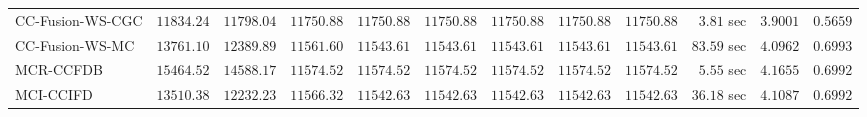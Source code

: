 \begin{table}[H]
\begin{tabular}{lrrrrrrrrrrr}
    CC-Fusion-WS-CGC & $     11834.24$ & $     11798.04$ & $     11750.88$ & $     11750.88$ & $     11750.88$ & $     11750.88$ & $     11750.88$ & $     11750.88$ & $         3.81$ sec    & $       3.9001$  & $       0.5659$ \\ 
     CC-Fusion-WS-MC & $     13761.10$ & $     12389.89$ & $     11561.60$ & $     11543.61$ & $     11543.61$ & $     11543.61$ & $     11543.61$ & $     11543.61$ & $        83.59$ sec    & $       4.0962$  & $       0.6993$ \\ 
\cmidrule{1-1} 
           MCR-CCFDB & $     15464.52$ & $     14588.17$ & $     11574.52$ & $     11574.52$ & $     11574.52$ & $     11574.52$ & $     11574.52$ & $     11574.52$ & $         5.55$ sec    & $       4.1655$  & $       0.6992$ \\ 
\cmidrule{1-1} 
           MCI-CCIFD & $     13510.38$ & $     12232.23$ & $     11566.32$ & $     11542.63$ & $     11542.63$ & $     11542.63$ & $     11542.63$ & $     11542.63$ & $        36.18$ sec    & $       4.1087$  & $       0.6992$ \\ 
\bottomrule
\end{tabular}
\end{table}

